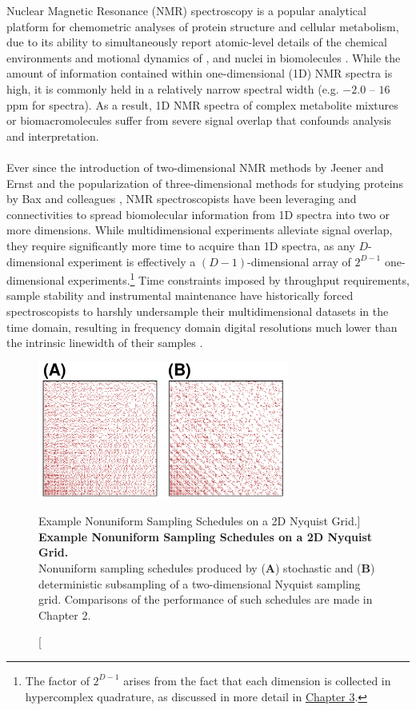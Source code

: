 \begin{doublespace}
Nuclear Magnetic Resonance (NMR) spectroscopy is a popular analytical platform
for chemometric analyses of protein structure and cellular metabolism, due to
its ability to simultaneously report atomic-level details of the chemical
environments and motional dynamics of \hnmr{}, \cnmr{} and \nnmr{} nuclei in
biomolecules \cite{abragam1961,levitt2008}. While the amount of
information contained within one-dimensional (1D) NMR spectra is high, it is
commonly held in a relatively narrow spectral width
(e.g. $-2.0$ -- $16$ ppm for \hnmr{} spectra). As a result, 1D \hnmr{} NMR spectra
of complex metabolite mixtures or biomacromolecules suffer from severe signal
overlap that confounds analysis and interpretation.
\\\\
Ever since the introduction of two-dimensional NMR methods by Jeener and Ernst
\cite{ernst:chim1975,maudsley:cpl1977} and the popularization of
three-dimensional methods for studying proteins by Bax and colleagues
\cite{marion:jacs1989,kay:bioc1989}, NMR spectroscopists have been
leveraging \hcnmr{} and \hnnmr{} connectivities to spread biomolecular
information from 1D \hnmr{} spectra into two or more dimensions. While
multidimensional experiments alleviate signal overlap, they require
significantly more time to acquire than 1D spectra, as any $D$-dimensional
experiment is effectively a $(D-1)$-dimensional array of $2^{D-1}$
one-dimensional experiments.\footnote{The factor of $2^{D-1}$ arises from the
fact that each dimension is collected in hypercomplex quadrature, as discussed
in more detail in \hyperlink{subsection.3.3.1}{Chapter 3}.} Time
constraints imposed by throughput requirements, sample stability and
instrumental maintenance have historically forced spectroscopists to harshly
undersample their multidimensional datasets in the time domain, resulting in
frequency domain digital resolutions much lower than the intrinsic linewidth
of their samples \cite{szyperski:pnas2002,rovnyak:jbnmr2004}.
\end{doublespace}

\begin{figure}
\includegraphics[width=3.25in]{figs/intro/02-sched.png}
\caption
      [Example Nonuniform Sampling Schedules on a 2D Nyquist Grid.]{
  {\bf Example Nonuniform Sampling Schedules on a 2D Nyquist Grid.}
  \\
  Nonuniform sampling schedules produced by ({\bf A}) stochastic and
  ({\bf B}) deterministic subsampling of a two-dimensional Nyquist sampling
  grid. Comparisons of the performance of such schedules are made in
  Chapter 2.
}
\label{figure.1.2}
\end{figure}

